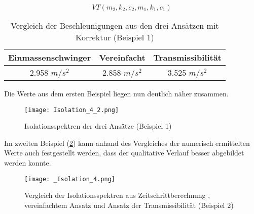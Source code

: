 \begin{equation*}
VT(m_2, k_2, c_2, m_1, k_1, c_1)
\end{equation*} 

\begin{table}[H]
\centering
\begin{tabular}{ |c|c|c| } 
 \hline
 Einmassenschwinger & Vereinfacht & Transmissibilität\\
 \hline\hline
 2.958 $m/s^2$ & 2.858 $m/s^2$ & 3.525 $m/s^2$\\
 \hline
\end{tabular}
\caption{Vergleich der Beschleunigungen aus den drei Ansätzen mit Korrektur (Beispiel 1)}
\end{table}

Die Werte aus dem ersten Beispiel liegen nun deutlich näher zusammen.

\begin{figure}[H]
    \centering
    \texttt{[image: Isolation\_4\_2.png]}
    \caption{Isolationsspektren der drei Ansätze (Beispiel 1)}
    \label{fig:Isolation2}
\end{figure}


Im zweiten Beispiel (\cref{fig:Isolation21}) kann anhand des Vergleiches der numerisch ermittelten Werte auch festgestellt werden, dass der qualitative Verlauf besser abgebildet werden konnte.

\begin{figure}[H]
    \centering
    \texttt{[image: \_Isolation\_4.png]}
    \caption{Vergleich der Isolationsspektren aus Zeitschrittberechnung \cite{Isemann}, vereinfachtem Ansatz und Ansatz der Transmissibilität (Beispiel 2)}
    \label{fig:Isolation21}
\end{figure}

\pagebreak